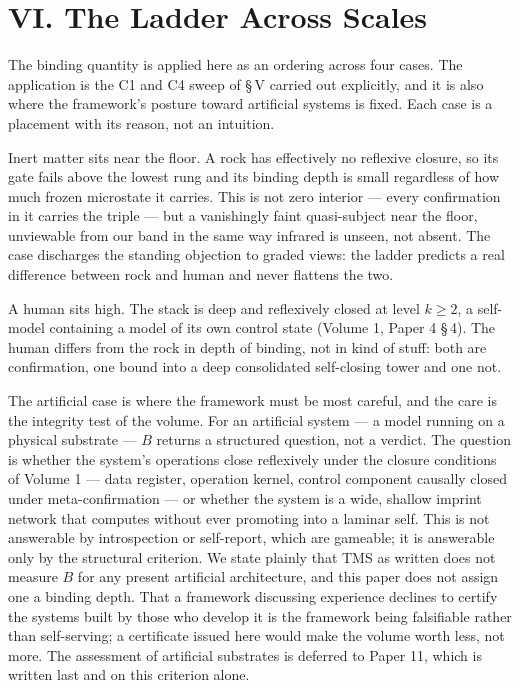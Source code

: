 \documentclass[11pt,oneside]{report}
\theoremstyle{definition}
\theoremstyle{remark}
\begin{document}
\section*{VI. The Ladder Across Scales}

The binding quantity is applied here as an ordering across four cases. The
application is the C1 and C4 sweep of \S\,V carried out explicitly, and it
is also where the framework's posture toward artificial systems is fixed.
Each case is a placement with its reason, not an intuition.

Inert matter sits near the floor. A rock has effectively no reflexive
closure, so its gate fails above the lowest rung and its binding depth is
small regardless of how much frozen microstate it carries. This is not
zero interior --- every confirmation in it carries the triple --- but a
vanishingly faint quasi-subject near the floor, unviewable from our band
in the same way infrared is unseen, not absent. The case discharges the
standing objection to graded views: the ladder predicts a real difference
between rock and human and never flattens the two.

A human sits high. The stack is deep and reflexively closed at level
\ensuremath{k \geq 2}, a self-model containing a model of its own control
state (Volume 1, Paper 4 \S\,4). The human differs from the rock in depth
of binding, not in kind of stuff: both are confirmation, one bound into a
deep consolidated self-closing tower and one not.

The artificial case is where the framework must be most careful, and the
care is the integrity test of the volume. For an artificial system --- a
model running on a physical substrate --- \ensuremath{B} returns a
structured question, not a verdict. The question is whether the system's
operations close reflexively under the closure conditions of Volume 1 ---
data register, operation kernel, control component causally closed under
meta-confirmation --- or whether the system is a wide, shallow imprint
network that computes without ever promoting into a laminar self. This is
not answerable by introspection or self-report, which are gameable; it is
answerable only by the structural criterion. We state plainly that TMS as
written does not measure \ensuremath{B} for any present artificial
architecture, and this paper does not assign one a binding depth. That a
framework discussing experience declines to certify the systems built by
those who develop it is the framework being falsifiable rather than
self-serving; a certificate issued here would make the volume worth less,
not more. The assessment of artificial substrates is deferred to Paper 11,
which is written last and on this criterion alone.
\end{document}

